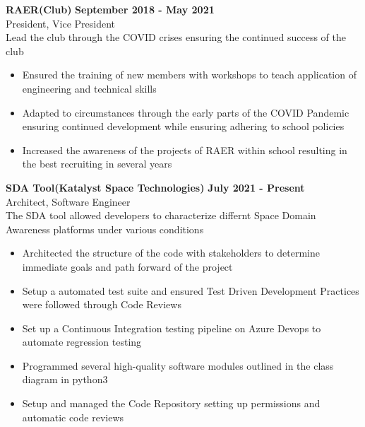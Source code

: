 \documentclass[10pt]{article}
\newcommand{\entrySpacing}{4pt}
\begin{document}
\noindent\begin{minipage}{\linewidth}
\textbf{RAER(Club)} \hfill \textbf{September 2018 - May 2021}\\
President, Vice President\hfill \\Lead the club through the COVID crises ensuring the continued success of the club
\begin{itemize}[noitemsep,nolistsep]
\item Ensured the training of new members with workshops to teach application of engineering and technical skills
\item Adapted to circumstances through the early parts of the COVID  Pandemic ensuring continued development while ensuring adhering to school policies
\item Increased the awareness of the projects of RAER within school resulting in the best recruiting in several years
\end{itemize}


\end{minipage}
\vspace{\entrySpacing}

\noindent\begin{minipage}{\linewidth}
\textbf{SDA Tool(Katalyst Space Technologies)} \hfill \textbf{July 2021 - Present}\\
Architect, Software Engineer\hfill \\The SDA tool allowed developers to characterize differnt Space Domain Awareness platforms under various conditions
\begin{itemize}[noitemsep,nolistsep]
\item Architected the structure of the code with stakeholders to determine immediate goals and path forward of the project
\item Setup a automated test suite and ensured Test Driven Development Practices were followed through Code Reviews
\item Set up a Continuous Integration testing pipeline on Azure Devops to automate regression testing
\item Programmed several high-quality software modules outlined in the class diagram in python3
\item Setup and managed the Code Repository setting up permissions and automatic code reviews
\end{itemize}


\end{minipage}
\vspace{\entrySpacing}
\end{document}
